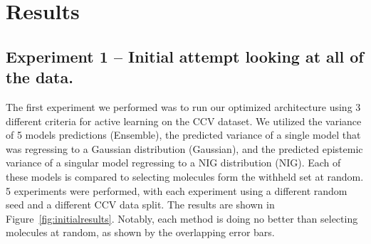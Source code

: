 \documentclass[journal=jmcmar,manuscript=article]{achemso}
\begin{document}
\section{Results}

\subsection{Experiment 1 -- Initial attempt looking at all of the data.}
The first experiment we performed was to run our optimized architecture using 3 different criteria for active learning on the CCV dataset. We utilized the variance of 5 models predictions (Ensemble), the predicted variance of a single model that was regressing to a Gaussian distribution (Gaussian), and the predicted epistemic variance of a singular model regressing to a NIG distribution (NIG). Each of these models is compared to selecting molecules form the withheld set at random. 5 experiments were performed, with each experiment using a different random seed and a different CCV data split. The results are shown in Figure~\ref{fig:initialresults}. Notably, each method is doing no better than selecting molecules at random, as shown by the overlapping error bars.
\end{document}
